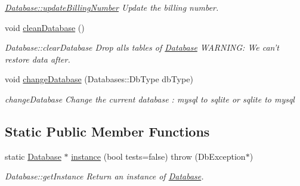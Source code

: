 \begin{DoxyCompactItemize}
\begin{DoxyCompactList}\small\item\em \hyperlink{classDatabases_1_1Database_a17b652086514e0a64d0e452a938ac7a5}{Database\-::update\-Billing\-Number} Update the billing number. \end{DoxyCompactList}\item 
\hypertarget{classDatabases_1_1Database_a52c30975504e35c7c475a52817d66b73}{void \hyperlink{classDatabases_1_1Database_a52c30975504e35c7c475a52817d66b73}{clean\-Database} ()}\label{classDatabases_1_1Database_a52c30975504e35c7c475a52817d66b73}

\begin{DoxyCompactList}\small\item\em Database\-::clear\-Database Drop alls tables of \hyperlink{classDatabases_1_1Database}{Database} W\-A\-R\-N\-I\-N\-G\-: We can't restore data after. \end{DoxyCompactList}\item 
void \hyperlink{classDatabases_1_1Database_a7d5635c502e3eab85635c35a7b3a81e1}{change\-Database} (Databases\-::\-Db\-Type db\-Type)
\begin{DoxyCompactList}\small\item\em change\-Database Change the current database \-: mysql to sqlite or sqlite to mysql \end{DoxyCompactList}\end{DoxyCompactItemize}
\subsection*{Static Public Member Functions}
\begin{DoxyCompactItemize}
\item 
static \hyperlink{classDatabases_1_1Database}{Database} $\ast$ \hyperlink{classDatabases_1_1Database_a3cf57f0af08ad3f4d588d59eafcadb56}{instance} (bool tests=false)  throw (\-Db\-Exception$\ast$)
\begin{DoxyCompactList}\small\item\em Database\-::get\-Instance Return an instance of \hyperlink{classDatabases_1_1Database}{Database}. \end{DoxyCompactList}\end{DoxyCompactItemize}
